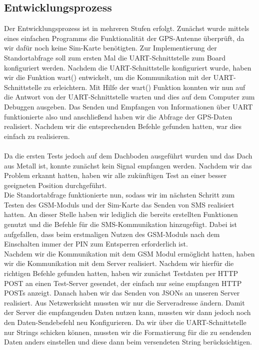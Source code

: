\subsection{Entwicklungsprozess}
Der Entwicklungsprozess ist in mehreren Stufen erfolgt. 
Zunächst wurde mittels eines einfachen Programms die Funktionalität der GPS-Antenne überprüft, da wir dafür noch keine Sim-Karte benötigten. Zur Implementierung der Standortabfrage soll zum ersten Mal die UART-Schnittstelle zum Board konfiguriert werden. Nachdem die UART-Schnittstelle konfiguriert wurde, haben wir die Funktion wart() entwickelt, um die Kommunikation mit der UART-Schnittstelle zu erleichtern. Mit Hilfe der wart() Funktion konnten wir nun auf die Antwort von der UART-Schnittstelle warten und dies auf dem Computer zum Debuggen ausgeben. Das Senden und Empfangen von Informationen über UART funktionierte also und anschließend haben wir die Abfrage der GPS-Daten realisiert. Nachdem wir die entsprechenden Befehle gefunden hatten, war dies einfach zu realisieren.
\\
\\
Da die ersten Tests jedoch auf dem Dachboden ausgeführt wurden und das Dach aus Metall ist, konnte zunächst kein Signal empfangen werden. Nachdem wir das Problem erkannt hatten, haben wir alle zukünftigen Test an einer besser geeigneten Position durchgeführt.
\\
Die Standortabfrage funktionierte nun, sodass wir im nächsten Schritt zum Testen des GSM-Moduls und der Sim-Karte das Senden von SMS realisiert hatten. An dieser Stelle haben wir lediglich die bereits erstellten Funktionen genutzt und die Befehle für die SMS-Kommunikation hinzugefügt. Dabei ist aufgefallen, dass beim erstmaligen Nutzen des GSM-Moduls nach dem Einschalten immer der PIN zum Entsperren erforderlich ist. 
\\
Nachdem wir die Kommunikation mit dem GSM Modul ermöglicht hatten, haben wir die Kommunikation mit dem Server realisiert.
Nachdem wir hierfür die richtigen Befehle gefunden hatten, haben wir zunächst Testdaten per HTTP POST an einen Test-Server gesendet, der einfach nur seine empfangen HTTP POSTs anzeigt. Danach haben wir das Senden von JSONs an unseren Server realisiert. Aus Netzwerksicht mussten wir nur die Serveradresse ändern.  Damit der Server die empfangenden Daten nutzen kann, mussten wir dann jedoch noch den Daten-Sendebefehl neu Konfigurieren. Da wir über die UART-Schnittstelle nur Strings schicken können, mussten wir die Formatierung für die zu sendenden Daten anders einstellen und diese  dann beim versendeten String berücksichtigen. 
